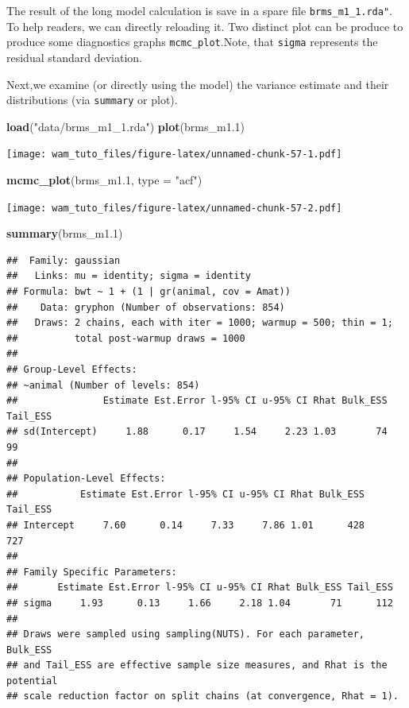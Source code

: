 \documentclass[
  12pt,
]{book}
\newenvironment{Shaded}{\begin{snugshade}}{\end{snugshade}}
\newcommand{\DataTypeTok}[1]{\textcolor[rgb]{0.13,0.29,0.53}{#1}}
\newcommand{\FloatTok}[1]{\textcolor[rgb]{0.00,0.00,0.81}{#1}}
\newcommand{\KeywordTok}[1]{\textcolor[rgb]{0.13,0.29,0.53}{\textbf{#1}}}
\newcommand{\NormalTok}[1]{#1}
\newcommand{\StringTok}[1]{\textcolor[rgb]{0.31,0.60,0.02}{#1}}
\begin{document}
The result of the long model calculation is save in a spare file \texttt{brms\_m1\_1.rda"}. To help readers, we can directly reloading it.
Two distinct plot can be produce to produce some diagnostics graphs \texttt{mcmc\_plot}.Note, that \texttt{sigma} represents the residual standard deviation.

Next,we examine (or directly using the model) the variance estimate and their distributions (via \texttt{summary} or plot).

\begin{Shaded}
\begin{Highlighting}[]
\KeywordTok{load}\NormalTok{(}\StringTok{"data/brms\_m1\_1.rda"}\NormalTok{)}
\KeywordTok{plot}\NormalTok{(brms\_m1}\FloatTok{.1}\NormalTok{)}
\end{Highlighting}
\end{Shaded}

\texttt{[image: wam\_tuto\_files/figure-latex/unnamed-chunk-57-1.pdf]}

\begin{Shaded}
\begin{Highlighting}[]
\KeywordTok{mcmc\_plot}\NormalTok{(brms\_m1}\FloatTok{.1}\NormalTok{, }\DataTypeTok{type =} \StringTok{"acf"}\NormalTok{)}
\end{Highlighting}
\end{Shaded}

\texttt{[image: wam\_tuto\_files/figure-latex/unnamed-chunk-57-2.pdf]}

\begin{Shaded}
\begin{Highlighting}[]
\KeywordTok{summary}\NormalTok{(brms\_m1}\FloatTok{.1}\NormalTok{)}
\end{Highlighting}
\end{Shaded}

\begin{verbatim}
##  Family: gaussian 
##   Links: mu = identity; sigma = identity 
## Formula: bwt ~ 1 + (1 | gr(animal, cov = Amat)) 
##    Data: gryphon (Number of observations: 854) 
##   Draws: 2 chains, each with iter = 1000; warmup = 500; thin = 1;
##          total post-warmup draws = 1000
## 
## Group-Level Effects: 
## ~animal (Number of levels: 854) 
##               Estimate Est.Error l-95% CI u-95% CI Rhat Bulk_ESS Tail_ESS
## sd(Intercept)     1.88      0.17     1.54     2.23 1.03       74       99
## 
## Population-Level Effects: 
##           Estimate Est.Error l-95% CI u-95% CI Rhat Bulk_ESS Tail_ESS
## Intercept     7.60      0.14     7.33     7.86 1.01      428      727
## 
## Family Specific Parameters: 
##       Estimate Est.Error l-95% CI u-95% CI Rhat Bulk_ESS Tail_ESS
## sigma     1.93      0.13     1.66     2.18 1.04       71      112
## 
## Draws were sampled using sampling(NUTS). For each parameter, Bulk_ESS
## and Tail_ESS are effective sample size measures, and Rhat is the potential
## scale reduction factor on split chains (at convergence, Rhat = 1).
\end{verbatim}
\end{document}
